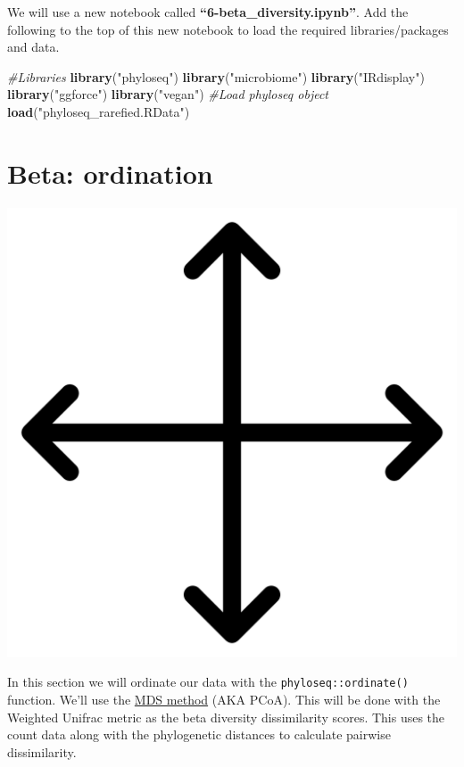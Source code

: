 \documentclass[
]{book}
\newenvironment{Shaded}{\begin{snugshade}}{\end{snugshade}}
\newcommand{\CommentTok}[1]{\textcolor[rgb]{0.56,0.35,0.01}{\textit{#1}}}
\newcommand{\FunctionTok}[1]{\textcolor[rgb]{0.13,0.29,0.53}{\textbf{#1}}}
\newcommand{\NormalTok}[1]{#1}
\newcommand{\StringTok}[1]{\textcolor[rgb]{0.31,0.60,0.02}{#1}}
\begin{document}
We will use a new notebook called \textbf{``6-beta\_diversity.ipynb''}.
Add the following to the top of this new notebook to load the required libraries/packages and data.

\begin{Shaded}
\begin{Highlighting}[]
\CommentTok{\#Libraries}
\FunctionTok{library}\NormalTok{(}\StringTok{"phyloseq"}\NormalTok{)}
\FunctionTok{library}\NormalTok{(}\StringTok{"microbiome"}\NormalTok{)}
\FunctionTok{library}\NormalTok{(}\StringTok{"IRdisplay"}\NormalTok{)}
\FunctionTok{library}\NormalTok{(}\StringTok{"ggforce"}\NormalTok{)}
\FunctionTok{library}\NormalTok{(}\StringTok{"vegan"}\NormalTok{)}
\CommentTok{\#Load phyloseq object}
\FunctionTok{load}\NormalTok{(}\StringTok{"phyloseq\_rarefied.RData"}\NormalTok{)}
\end{Highlighting}
\end{Shaded}

\hypertarget{beta-ordination}{%
\section{Beta: ordination}\label{beta-ordination}}

\includegraphics{figures/ordinate.png}

In this section we will ordinate our data with the \texttt{phyloseq::ordinate()} function.
We'll use the \href{https://en.wikipedia.org/wiki/Multidimensional_scaling}{MDS method} (AKA PCoA).
This will be done with the Weighted Unifrac metric as the beta diversity dissimilarity scores.
This uses the count data along with the phylogenetic distances to calculate pairwise dissimilarity.
\end{document}
